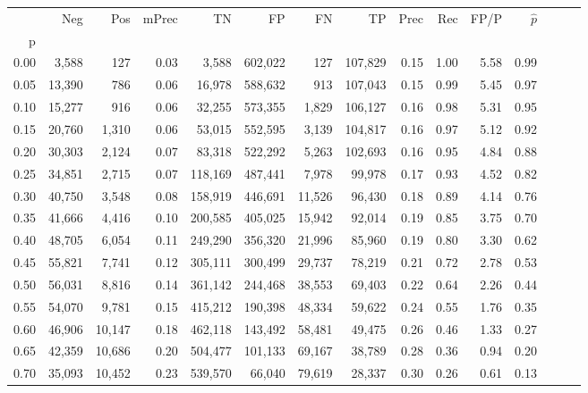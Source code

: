\begin{tabular}{rrrrrrrrrrrrrrr}
\toprule
{} &     Neg &     Pos & mPrec &       TN &       FP &       FN &       TP &  Prec &   Rec &  FP/P & $\hat{p}$ \\
p    &         &         &       &          &          &          &          &       &       &       &           \\
\midrule
0.00 &   3,588 &     127 &  0.03 &    3,588 &  602,022 &      127 &  107,829 &  0.15 &  1.00 &  5.58 &      0.99 \\
0.05 &  13,390 &     786 &  0.06 &   16,978 &  588,632 &      913 &  107,043 &  0.15 &  0.99 &  5.45 &      0.97 \\
0.10 &  15,277 &     916 &  0.06 &   32,255 &  573,355 &    1,829 &  106,127 &  0.16 &  0.98 &  5.31 &      0.95 \\
0.15 &  20,760 &   1,310 &  0.06 &   53,015 &  552,595 &    3,139 &  104,817 &  0.16 &  0.97 &  5.12 &      0.92 \\
0.20 &  30,303 &   2,124 &  0.07 &   83,318 &  522,292 &    5,263 &  102,693 &  0.16 &  0.95 &  4.84 &      0.88 \\
0.25 &  34,851 &   2,715 &  0.07 &  118,169 &  487,441 &    7,978 &   99,978 &  0.17 &  0.93 &  4.52 &      0.82 \\
0.30 &  40,750 &   3,548 &  0.08 &  158,919 &  446,691 &   11,526 &   96,430 &  0.18 &  0.89 &  4.14 &      0.76 \\
0.35 &  41,666 &   4,416 &  0.10 &  200,585 &  405,025 &   15,942 &   92,014 &  0.19 &  0.85 &  3.75 &      0.70 \\
0.40 &  48,705 &   6,054 &  0.11 &  249,290 &  356,320 &   21,996 &   85,960 &  0.19 &  0.80 &  3.30 &      0.62 \\
0.45 &  55,821 &   7,741 &  0.12 &  305,111 &  300,499 &   29,737 &   78,219 &  0.21 &  0.72 &  2.78 &      0.53 \\
0.50 &  56,031 &   8,816 &  0.14 &  361,142 &  244,468 &   38,553 &   69,403 &  0.22 &  0.64 &  2.26 &      0.44 \\
0.55 &  54,070 &   9,781 &  0.15 &  415,212 &  190,398 &   48,334 &   59,622 &  0.24 &  0.55 &  1.76 &      0.35 \\
0.60 &  46,906 &  10,147 &  0.18 &  462,118 &  143,492 &   58,481 &   49,475 &  0.26 &  0.46 &  1.33 &      0.27 \\
0.65 &  42,359 &  10,686 &  0.20 &  504,477 &  101,133 &   69,167 &   38,789 &  0.28 &  0.36 &  0.94 &      0.20 \\
0.70 &  35,093 &  10,452 &  0.23 &  539,570 &   66,040 &   79,619 &   28,337 &  0.30 &  0.26 &  0.61 &      0.13 \\

\end{tabular}
